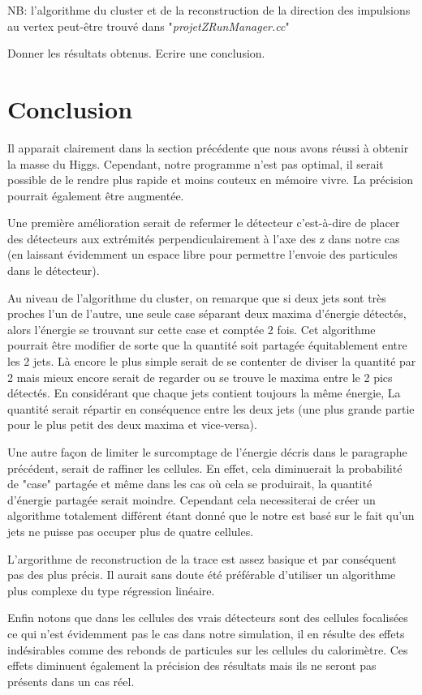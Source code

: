 \documentclass[11pt]{article}
\begin{document}
NB: l'algorithme du cluster et de la reconstruction de la direction des
impulsions au vertex peut-être trouvé dans "\textit{projetZRunManager.cc}"


Donner les résultats obtenus.
Ecrire une conclusion.

\section{Conclusion}
 Il apparait clairement dans la section pr\'ec\'edente que nous avons r\'eussi \`a obtenir la masse du Higgs.
Cependant, notre programme n'est pas optimal, il serait possible de le rendre plus rapide et 
moins couteux en m\'emoire vivre. La pr\'ecision pourrait \'egalement être augment\'ee. 

Une première amélioration serait de refermer le d\'etecteur c'est-à-dire de placer des d\'etecteurs aux extrémités 
perpendiculairement à l'axe des z dans notre cas (en laissant évidemment un espace libre pour permettre l'envoie des 
particules dans le d\'etecteur). 

Au niveau de l'algorithme du cluster, on remarque que si deux jets sont très proches l'un de l'autre, une seule case 
s\'eparant deux maxima d'énergie détectés, alors l'énergie se trouvant sur cette case et comptée 2 fois. Cet algorithme
 pourrait être modifier de sorte que la quantité soit partagée équitablement entre les 2 jets. Là encore
le plus simple serait  de se contenter de diviser la quantité par 2 mais mieux encore serait de regarder ou se trouve le 
maxima entre le 2 pics détectés. En considérant que chaque jets contient toujours la même énergie, La quantité serait
répartir en conséquence entre les deux jets (une plus grande partie pour le plus petit des deux maxima et vice-versa).

Une autre façon de limiter le surcomptage de l'énergie décris dans le paragraphe précédent, serait de raffiner les 
cellules. En effet, cela diminuerait la probabilité de "case" partagée et même dans les cas où cela se produirait, la
quantité d'énergie partagée serait moindre. Cependant cela necessiterai de créer un algorithme totalement différent
étant donné que le notre est basé sur le fait qu'un jets ne puisse pas occuper plus de quatre cellules.

L'argorithme de reconstruction de la trace est assez basique et par conséquent pas des plus précis. Il aurait sans doute
été préférable d'utiliser un algorithme plus complexe du type régression linéaire.

Enfin notons que dans les cellules des vrais d\'etecteurs sont des cellules focalisées ce qui n'est évidemment pas le 
cas dans notre simulation, il en résulte des effets indésirables comme des rebonds de particules sur les cellules du
calorimètre. Ces effets diminuent également la précision des résultats mais ils ne seront pas présents dans un cas réel.


		
\end{document}
